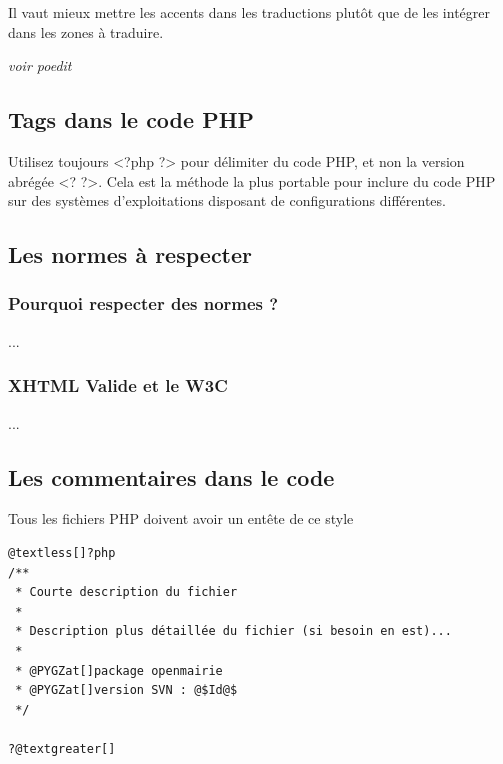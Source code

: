 \documentclass[letterpaper,10pt,french]{manual}
\begin{document}
Il vaut mieux mettre les accents dans les traductions plutôt que
de les intégrer dans les zones à traduire.

\emph{voir poedit}

\resetcurrentobjects
\hypertarget{--doc-regles/tags}{}

\hypertarget{tags}{}\subsection{Tags dans le code PHP}

Utilisez toujours \textless{}?php ?\textgreater{} pour délimiter du code PHP, et non la version
abrégée \textless{}? ?\textgreater{}. Cela est la méthode la plus portable pour inclure du code PHP
sur des systèmes d'exploitations disposant de configurations différentes.

\resetcurrentobjects
\hypertarget{--doc-regles/norme}{}

\hypertarget{norme}{}\subsection{Les normes à respecter}


\subsubsection{Pourquoi respecter des normes ?}

...


\subsubsection{XHTML Valide et le W3C}

...

\resetcurrentobjects
\hypertarget{--doc-regles/commentaire}{}

\hypertarget{commentaire}{}\subsection{Les commentaires dans le code}

Tous les fichiers PHP doivent avoir un entête de ce style

\begin{Verbatim}[commandchars=@\[\]]
@textless[]?php
/**
 * Courte description du fichier
 *
 * Description plus détaillée du fichier (si besoin en est)...
 *
 * @PYGZat[]package openmairie
 * @PYGZat[]version SVN : @$Id@$
 */

?@textgreater[]
\end{Verbatim}
\end{document}
